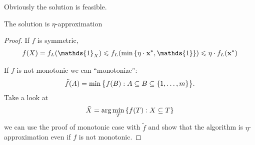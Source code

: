  Obviously the solution is feasible.
 \begin{prop}
 	The solution is $\eta$-approximation
 	\begin{proof}
 		If $f$ is symmetric,
 		\begin{align}
 		f(X) = f_L(\mathds{1}_X) \leqslant f_L\qty( \min \qty{ \eta \cdot \vb{x}^*, \mathds{1} }) \leqslant \eta \cdot f_L(\vb{x}^*)
 		\end{align}
 		
 		If $f$ is not monotonic we can ``monotonize'':
 		\begin{align}
 		\tilde{f}(A) = \min \qty\big{f(B): A\subseteq B \subseteq \qty{1, \dots, m}}.
 		\end{align}
 		Take a look at
 		\begin{align}
 		\tilde{X} = \arg \min\limits_T \qty{f(T) : X\subseteq T}
 		\end{align}
 		we can use the proof of monotonic case with $\tilde{f}$ and show that the algorithm is $\eta$-approximation even if $f$ is not monotonic.
 	\end{proof}
 \end{prop}